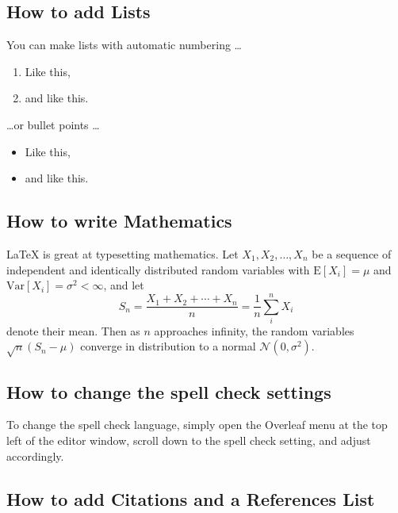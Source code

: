
\subsection{How to add Lists}

You can make lists with automatic numbering \dots

\begin{enumerate}
    \item Like this,
    \item and like this.
\end{enumerate}
\dots or bullet points \dots
\begin{itemize}
    \item Like this,
    \item and like this.
\end{itemize}


\subsection{How to write Mathematics}

\LaTeX{} is great at typesetting mathematics. Let $X_1, X_2, \ldots, X_n$ be a sequence of independent and identically distributed random variables with $\text{E}[X_i] = \mu$ and $\text{Var}[X_i] = \sigma^2 < \infty$, and let
\[S_n = \frac{X_1 + X_2 + \cdots + X_n}{n}
      = \frac{1}{n}\sum_{i}^{n} X_i\]
denote their mean. Then as $n$ approaches infinity, the random variables $\sqrt{n}(S_n - \mu)$ converge in distribution to a normal $\mathcal{N}(0, \sigma^2)$.


\subsection{How to change the spell check settings}

To change the spell check language, simply open the Overleaf menu at the top left of the editor window, scroll down to the spell check setting, and adjust accordingly.


\subsection{How to add Citations and a References List}

